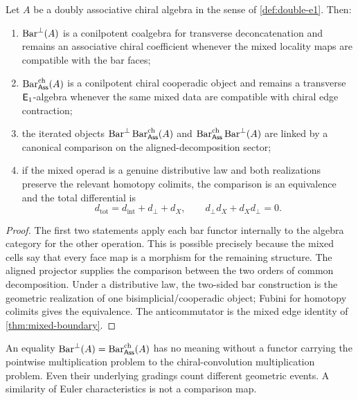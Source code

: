 \begin{theorem}\label{thm:two-bars}
Let \(A\) be a doubly associative chiral algebra in the sense of \cref{def:double-e1}.  Then:
\begin{enumerate}
\item \(\operatorname{Bar}^\perp(A)\) is a conilpotent coalgebra for transverse deconcatenation and remains an associative chiral coefficient whenever the mixed locality maps are compatible with the bar faces;
\item \(\operatorname{Bar}^{\mathrm{ch}}_{\mathsf{Ass}}(A)\) is a conilpotent chiral cooperadic object and remains a transverse \(\mathsf E_1\)-algebra whenever the same mixed data are compatible with chiral edge contraction;
\item the iterated objects \(\operatorname{Bar}^\perp\operatorname{Bar}^{\mathrm{ch}}_{\mathsf{Ass}}(A)\) and \(\operatorname{Bar}^{\mathrm{ch}}_{\mathsf{Ass}}\operatorname{Bar}^\perp(A)\) are linked by a canonical comparison on the aligned-decomposition sector;
\item if the mixed operad is a genuine distributive law and both realizations preserve the relevant homotopy colimits, the comparison is an equivalence and the total differential is
\[
 d_{\mathrm{tot}}=d_{\mathrm{int}}+d_\perp+d_X,
 \qquad d_\perp d_X+d_Xd_\perp=0.
\]
\end{enumerate}
\end{theorem}
\begin{proof}
The first two statements apply each bar functor internally to the algebra category for the other operation.  This is possible precisely because the mixed cells say that every face map is a morphism for the remaining structure.  The aligned projector supplies the comparison between the two orders of common decomposition.  Under a distributive law, the two-sided bar construction is the geometric realization of one bisimplicial/cooperadic object; Fubini for homotopy colimits gives the equivalence.  The anticommutator is the mixed edge identity of \cref{thm:mixed-boundary}.
\end{proof}

\begin{nogobox}[title={No-go theorem 8: no unnamed comparison of bars}]
An equality
\(
 \operatorname{Bar}^\perp(A)=\operatorname{Bar}^{\mathrm{ch}}_{\mathsf{Ass}}(A)
\)
has no meaning without a functor carrying the pointwise multiplication problem to the chiral-convolution multiplication problem.  Even their underlying gradings count different geometric events.  A similarity of Euler characteristics is not a comparison map.
\end{nogobox}

